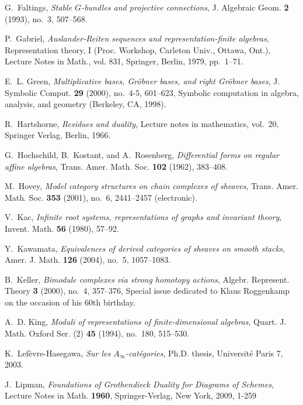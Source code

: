 \documentclass{amsart}
\numberwithin{equation}{section}
\theoremstyle{definition}
\theoremstyle{remark}
\begin{document}
\begin{thebibliography}{10}
G.~Faltings, \emph{Stable {$G$}-bundles and projective connections}, J.
  Algebraic Geom. \textbf{2} (1993), no.~3, 507--568.

P.~Gabriel, \emph{Auslander-{R}eiten sequences and representation-finite
  algebras}, Representation theory, I (Proc. Workshop, Carleton Univ., Ottawa,
  Ont.), Lecture Notes in Math., vol. 831, Springer, Berlin, 1979, pp.~1--71.

E.~L. Green, \emph{Multiplicative bases, {G}r\"obner bases, and right
  {G}r\"obner bases}, J. Symbolic Comput. \textbf{29} (2000), no.~4-5,
  601--623, Symbolic computation in algebra, analysis, and geometry (Berkeley,
  CA, 1998).

R.~Hartshorne, \emph{Residues and duality}, Lecture notes in mathematics,
  vol.~20, Springer Verlag, Berlin, 1966.

G.~Hochschild, B.~Kostant, and A.~Rosenberg, \emph{Differential forms on
  regular affine algebras}, Trans. Amer. Math. Soc. \textbf{102} (1962),
  383--408.

M.~Hovey, \emph{Model category structures on chain complexes of sheaves},
  Trans. Amer. Math. Soc. \textbf{353} (2001), no.~6, 2441--2457 (electronic).

V.~Kac, \emph{Infinite root systems, representations of graphs and invariant
  theory}, Invent. Math. \textbf{56} (1980), 57--92.

Y.~Kawamata, \emph{Equivalences of derived categories of sheaves on smooth
  stacks}, Amer. J. Math. \textbf{126} (2004), no.~5, 1057--1083.

B.~Keller, \emph{Bimodule complexes via strong homotopy actions}, Algebr.
  Represent. Theory \textbf{3} (2000), no.~4, 357--376, Special issue dedicated
  to Klaus Roggenkamp on the occasion of his 60th birthday.

A.~D. King, \emph{Moduli of representations of finite-dimensional algebras},
  Quart. J. Math. Oxford Ser. (2) \textbf{45} (1994), no.~180, 515--530.

K.~Lef\`evre-Hasegawa, \emph{Sur les {$A_\infty$}-cat\'egories}, Ph.D. thesis,
  Universit\'e Paris 7, 2003.
  
 J.~Lipman, \emph{Foundations of Grothendieck Duality for Diagrams of Schemes}, Lecture Notes in Math. \textbf{1960}, Springer-Verlag, New York, 2009, 1-259


\end{thebibliography}
\end{document}
